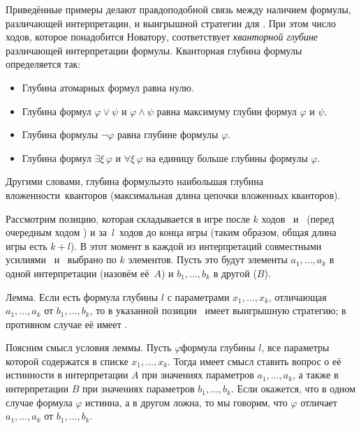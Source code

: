Приведённые примеры делают правдоподобной связь между наличием
формулы, различающей интерпретации, и выигрышной стратегии для
\Н. При этом число ходов, которое понадобится Новатору,
соответствует \emph{кванторной глубине}%
%
различающей
интерпретации формулы. Кванторная глубина формулы определяется
так:

\begin{itemize}
        \item
Глубина атомарных формул равна нулю.
        \item
Глубина формул $\varphi\vee\psi$ и $\varphi\wedge\psi$ равна
максимуму глубин формул $\varphi$ и $\psi$.
        \item
Глубина формулы $\neg\varphi$ равна глубине формулы $\varphi$.
        \item
Глубина формул $\exists\xi\,\varphi$ и $\forall\xi\,\varphi$ на
единицу больше глубины формулы $\varphi$.
\end{itemize}

Другими словами, глубина формулы\т это наибольшая  глубина
вложенности\ кванторов (максимальная длина цепочки вложенных
кванторов).

Рассмотрим позицию, которая складывается в игре после $k$
ходов \Н\ и \К\ (перед очередным ходом \Н) и
за~$l$~ходов до конца игры (таким образом,
общая длина игры есть $k+l$). В этот момент в каждой из
интерпретаций совместными усилиями \Н\ и \К\ выбрано по $k$
элементов. Пусть это будут элементы $a_1,\dots,a_k$ в одной
интерпретации (назовём её~$A$) и $b_1,\dots,b_k$ в другой ($B$).

\textsf{Лемма}. Если есть формула глубины
$l$ с параметрами $x_1,\dots,x_k$, отличающая $a_1,\dots,a_k$
от $b_1,\dots,b_k$, то в указанной позиции \Н\ имеет выигрышную
стратегию; в противном случае её имеет \К.

Поясним смысл условия леммы. Пусть $\varphi$\т формула глубины
$l$, все параметры которой содержатся в списке $x_1,\dots,x_k$.
Тогда имеет смысл ставить вопрос о её истинности в
интерпретации $A$ при значениях параметров $a_1,\dots,a_k$, а
также в интерпретации $B$ при значениях параметров
$b_1,\dots,b_k$. Если окажется, что в одном случае формула $\varphi$
истинна, а в другом ложна, то мы говорим, что $\varphi$ отличает
$a_1,\dots,a_k$ от $b_1,\dots,b_k$.

